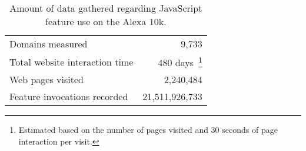 \begin{table}[ht]
  \centering
  \begin{tabular}{ l r }
    \toprule
      Domains measured                    &  9,733 \\
      Total website interaction time      &  480 days~\footnote{%
          Estimated based on the number of pages visited and 30 seconds of page
          interaction per visit.} \\
      Web pages visited                   &  2,240,484    \\
      Feature invocations recorded        &  21,511,926,733 \\
    \bottomrule
  \end{tabular}
  \caption{Amount of data gathered regarding JavaScript feature use on the Alexa 10k.}
  \label{fig:results-vanity-stats}
\end{table}
